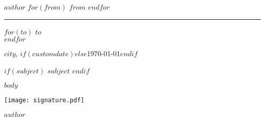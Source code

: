 \documentclass[$fontsize$, a4paper]{article}
\begin{document}
\small
\textsc{\textbf{$author$}}
$for(from)$
\textbullet{} \textsc{$from$}
$endfor$
\hrule
\vspace{1em}

\normalsize \sffamily
$for(to)$
$to$\\
$endfor$

\vspace{3em}

\rmfamily
\begin{flushright}
  $city$, $if(customdate)$$else$\today$endif$
\end{flushright}

\vspace{1em}

$if(subject)$
\textbf{$subject$}
$endif$

\vspace{1em}
\justifying
$body$

\begin{FlushRight}
  {
    \texttt{[image: signature.pdf]} \par
  }
  {
    \vspace{5.5\baselineskip}
  }
  $author$
\end{FlushRight}
\end{document}
